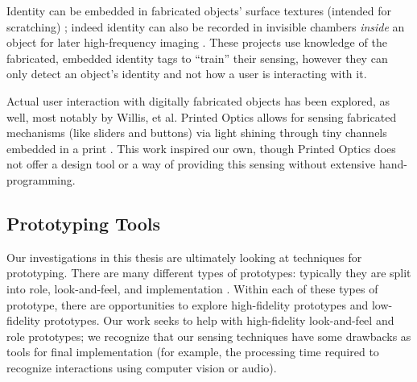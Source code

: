         Identity can be embedded in fabricated objects' surface textures (intended for scratching) \cite{harrison-acoustic}; indeed identity can also be recorded in invisible chambers \emph{inside} an object for later high-frequency imaging \cite{willis-infrastructs}. These projects use knowledge of the fabricated, embedded identity tags to ``train'' their sensing, however they can only detect an object's identity and not how a user is interacting with it.
        
        Actual user interaction with digitally fabricated objects has been explored, as well, most notably by Willis, et al. Printed Optics allows for sensing fabricated mechanisms (like sliders and buttons) via light shining through tiny channels embedded in a print \cite{willis-printedoptics}. This work inspired our own, though Printed Optics does not offer a design tool or a way of providing this sensing without extensive hand-programming.

\subsection{Prototyping Tools}

    Our investigations in this thesis are ultimately looking at techniques for prototyping. There are many different types of prototypes: typically they are split into role, look-and-feel, and implementation \cite{houde-prototypes}. Within each of these types of prototype, there are opportunities to explore high-fidelity prototypes and low-fidelity prototypes. Our work seeks to help with high-fidelity look-and-feel and role prototypes; we recognize that our sensing techniques have some drawbacks as tools for final implementation (for example, the processing time required to recognize interactions using computer vision or audio).
    
